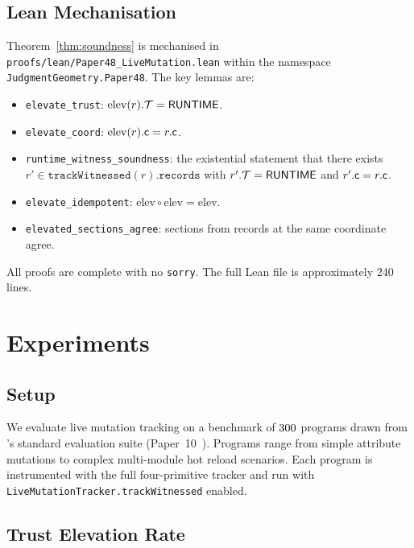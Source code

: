 \documentclass[11pt]{article}
\newcommand{\elevate}{\mathrm{elev}}             %
\begin{document}
\subsection{Lean Mechanisation}
\label{subsec:lean}

Theorem~\ref{thm:soundness} is mechanised in
\texttt{proofs/lean/Paper48\_LiveMutation.lean} within the namespace
\texttt{JudgmentGeometry.Paper48}.  The key lemmas are:

\begin{itemize}
\item \texttt{elevate\_trust}: $\elevate(r).\trust = \Truntime$.
\item \texttt{elevate\_coord}: $\elevate(r).\coord = r.\coord$.
\item \texttt{runtime\_witness\_soundness}: the existential statement
      that there exists $r' \in \texttt{trackWitnessed}(r).\texttt{records}$
      with $r'.\mathcal{T} = \mathsf{RUNTIME}$ and $r'.\mathsf{c} = r.\mathsf{c}$.
\item \texttt{elevate\_idempotent}: $\elevate \circ \elevate = \elevate$.
\item \texttt{elevated\_sections\_agree}: sections from records at
      the same coordinate agree.
\end{itemize}

All proofs are complete with no \texttt{sorry}.  The full Lean file
is approximately 240 lines.

\section{Experiments}
\label{sec:experiments}

\subsection{Setup}
\label{subsec:exp-setup}

We evaluate live mutation tracking on a benchmark of $300$
\Python{} programs drawn from \JuGeo's standard evaluation suite
(Paper~10~\cite{paper10-eval}).  Programs range from simple attribute
mutations to complex multi-module hot reload scenarios.  Each program
is instrumented with the full four-primitive tracker and run with
\texttt{LiveMutationTracker.trackWitnessed} enabled.

\subsection{Trust Elevation Rate}
\label{subsec:trust-rate}
\end{document}
